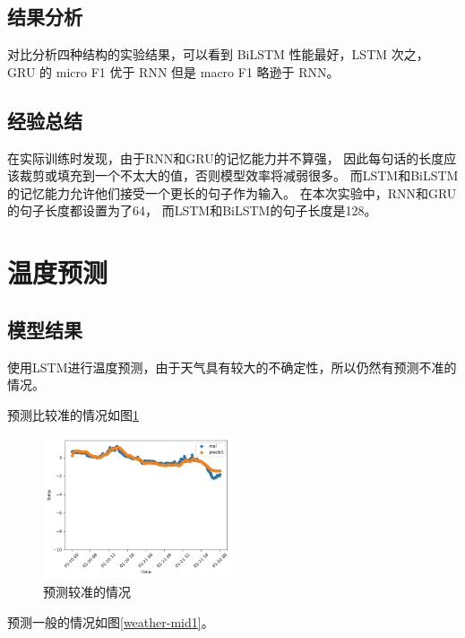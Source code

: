 \documentclass{article}
\begin{document}
\subsection{结果分析}

对比分析四种结构的实验结果，可以看到 BiLSTM 性能最好，LSTM 次之，
GRU 的 micro F1 优于 RNN 但是 macro F1 略逊于 RNN。

\subsection{经验总结}

在实际训练时发现，由于RNN和GRU的记忆能力并不算强，
因此每句话的长度应该裁剪或填充到一个不太大的值，否则模型效率将减弱很多。
而LSTM和BiLSTM的记忆能力允许他们接受一个更长的句子作为输入。
在本次实验中，RNN和GRU的句子长度都设置为了64，
而LSTM和BiLSTM的句子长度是128。

\section{温度预测}

\subsection{模型结果}

使用LSTM进行温度预测，由于天气具有较大的不确定性，所以仍然有预测不准的情况。

预测比较准的情况如图\ref{weather-good1}

\begin{figure}[H]
    \centering
    \includegraphics[width=0.5\textwidth]{figures/weather_good1.png}
    \caption{预测较准的情况}
    \label{weather-good1}
\end{figure}

预测一般的情况如图\ref{weather-mid1}。
\end{document}
